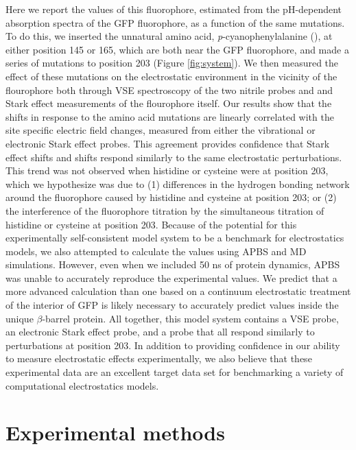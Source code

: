 Here we report the \pKa{} values of this fluorophore, estimated from the pH-dependent absorption spectra of the GFP fluorophore, as a function of the same mutations. 
To do this, we inserted the unnatural amino acid, \emph{p}-cyanophenylalanine (\pCNF{}), at either position 145 or 165, which are both near the GFP fluorophore, and made a series of mutations to position 203 (Figure \ref{fig:system}). 
We then measured the effect of these mutations on the electrostatic environment in the vicinity of the flourophore both through VSE spectroscopy of the two nitrile probes and \pKa{} and Stark effect measurements of the flourophore itself. 
Our results show that the \pKa{} shifts in response to the amino acid mutations are linearly correlated with the site specific electric field changes, measured from either the vibrational or electronic Stark effect probes. 
This agreement provides confidence that Stark effect shifts and \pKa{} shifts respond similarly to the same electrostatic perturbations. 
This trend was not observed when histidine or cysteine were at position 203, which we hypothesize was due to (1) differences in the hydrogen bonding network around the fluorophore caused by histidine and cysteine at position 203; or (2) the interference of the fluorophore titration by the simultaneous titration of histidine or cysteine at position 203. 
Because of the potential for this experimentally self-consistent model system to be a benchmark for electrostatics models, we also attempted to calculate the \pKa{} values using APBS and MD simulations.
However, even when we included 50 \si{\ns} of protein dynamics, APBS was unable to accurately reproduce the experimental \pKa{} values. 
We predict that a more advanced calculation than one based on a continuum electrostatic treatment of the interior of GFP is likely necessary to accurately predict \pKa{} values inside the unique $\beta$-barrel protein. 
All together, this model system contains a VSE probe, an electronic Stark effect probe, and a \pKa{} probe that all respond similarly to perturbations at position 203. 
In addition to providing confidence in our ability to measure electrostatic effects experimentally, we also believe that these experimental data are an excellent target data set for benchmarking a variety of computational electrostatics models.

\section{Experimental methods} \label{pKa-methods}

